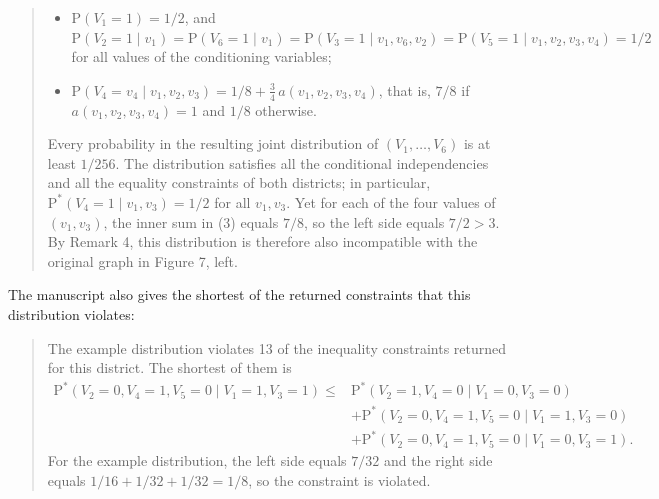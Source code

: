 \documentclass{article}
\def\Pr{{\mathrm{P}}}
\def\Pdo{{\mathrm{P}^*}}
\begin{document}
\begin{enumerate}
\begin{mdframed}
\begin{quote}
    \begin{itemize}
        \item $\Pr(V_1 = 1) = 1/2$, and $\Pr(V_2 = 1 \mid v_1) = \Pr(V_6 = 1 \mid v_1) = \Pr(V_3 = 1 \mid v_1, v_6, v_2) = \Pr(V_5 = 1 \mid v_1, v_2, v_3, v_4) = 1/2$ for all values of the conditioning variables;
        \item $\Pr(V_4 = v_4 \mid v_1, v_2, v_3) = 1/8 + \frac{3}{4}\, a(v_1, v_2, v_3, v_4)$, that is, $7/8$ if $a(v_1, v_2, v_3, v_4) = 1$ and $1/8$ otherwise.
    \end{itemize}
    Every probability in the resulting joint distribution of $(V_1, \ldots, V_6)$ is at least $1/256$. The distribution satisfies all the conditional independencies and all the equality constraints of both districts; in particular, $\Pdo(V_4 = 1 \mid v_1, v_3) = 1/2$ for all $v_1, v_3$. Yet for each of the four values of $(v_1, v_3)$, the inner sum in (3) equals $7/8$, so the left side equals $7/2 > 3$. By Remark 4, this distribution is therefore also incompatible with the original graph in Figure 7, left.
    \end{quote}
    The manuscript also gives the shortest of the returned constraints that this distribution violates:
    \begin{quote}
    The example distribution violates 13 of the inequality constraints returned for this district. The shortest of them is
    \begin{align*}
    \Pdo(V_2 = 0, V_4 = 1, V_5 = 0 \mid V_1 = 1, V_3 = 1) \leq{} & \Pdo(V_2 = 1, V_4 = 0 \mid V_1 = 0, V_3 = 0) \\
    & + \Pdo(V_2 = 0, V_4 = 1, V_5 = 0 \mid V_1 = 1, V_3 = 0) \\
    & + \Pdo(V_2 = 0, V_4 = 1, V_5 = 0 \mid V_1 = 0, V_3 = 1).
    \end{align*}
    For the example distribution, the left side equals $7/32$ and the right side equals $1/16 + 1/32 + 1/32 = 1/8$, so the constraint is violated.
    \end{quote}
\end{mdframed}


\end{enumerate}
\end{document}
